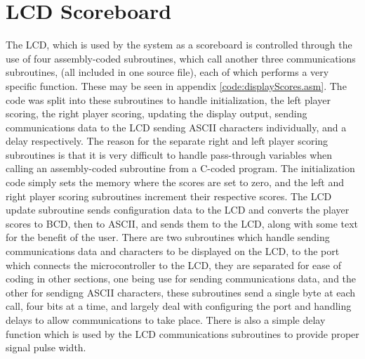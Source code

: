 \section{LCD Scoreboard} 

The LCD, which is used by the system as a scoreboard is controlled through the use of four assembly-coded subroutines, which call another three communications subroutines, (all included in one source file), each of which performs a very specific function.  
These may be seen in appendix \ref{code:displayScores.asm}.
The code was split into these subroutines to handle initialization, the left player scoring, the right player scoring, updating the display output, sending communications data to the LCD sending ASCII characters individually, and a delay respectively.
The reason for the separate right and left player scoring subroutines is that it is very difficult to handle pass-through variables when calling an assembly-coded subroutine from a C-coded program.  
The initialization code simply sets the memory where the scores are set to zero, and the left and right player scoring subroutines increment their respective scores.  
The LCD update subroutine sends configuration data to the LCD and converts the player scores to BCD, then to ASCII, and sends them to the LCD, along with some text for the benefit of the user.  
There are two subroutines which handle sending communications data and characters to be displayed on the LCD, to the port which connects the microcontroller to the LCD, they are separated for ease of coding in other sections, one being use for sending communications data, and the other for sendigng ASCII characters, these subroutines send a single byte at each call, four bits at a time, and largely deal with configuring the port and handling delays to allow communications to take place. 
There is also a simple delay function which is used by the LCD communications subroutines to provide proper signal pulse width.